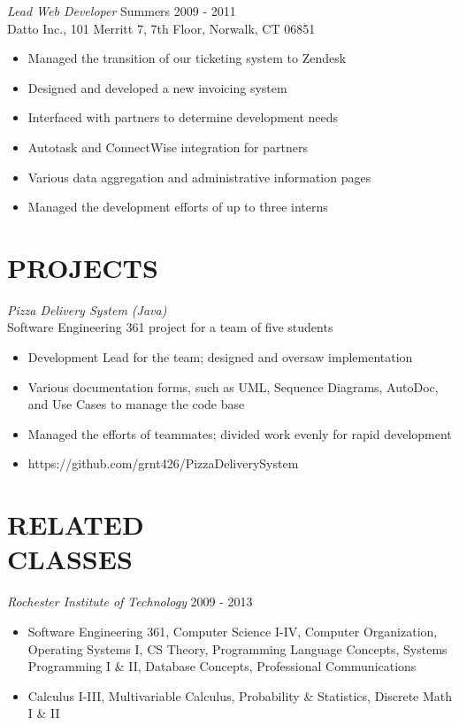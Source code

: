 \documentclass[line,margin]{res}
\begin{document}
\begin{resume}
	{\sl Lead Web Developer} \hfill Summers 2009 - 2011 \\
                Datto Inc., 
                101 Merritt 7, 7th Floor, Norwalk, CT 06851
                 \begin{itemize}  \itemsep -2pt %
	\item Managed the transition of our ticketing system to Zendesk
	\item Designed and developed a new invoicing system
	\item Interfaced with partners to determine development needs
	\item Autotask and ConnectWise integration for partners
	\item Various data aggregation and administrative information pages
	\item Managed the development efforts of up to three interns
	\end{itemize}
 
 
\section{PROJECTS}  

	{\sl Pizza Delivery System (Java)} \\
	Software Engineering 361 project for a team of five students
	  \begin{itemize}  \itemsep -2pt %
	\item Development Lead for the team; designed and oversaw implementation
	\item Various documentation forms, such as UML, Sequence Diagrams, AutoDoc, and Use Cases to manage the code base
	\item Managed the efforts of teammates; divided work evenly for rapid development
	\item https://github.com/grnt426/PizzaDeliverySystem
                \end{itemize}

\section{RELATED \\ CLASSES} {\sl Rochester Institute of Technology} \hfill 2009 - 2013
	\begin{itemize}  \itemsep -2pt %
	\item Software Engineering 361, Computer Science I-IV, Computer Organization, Operating Systems I, CS Theory, Programming Language Concepts, Systems Programming I \& II, Database Concepts, Professional Communications
	\item Calculus I-III, Multivariable Calculus, Probability \& Statistics, Discrete Math I \& II
	\end{itemize}


\end{resume}
\end{document}
